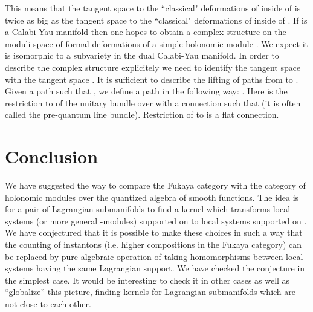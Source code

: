 \documentclass[a4paper,12pt]{article}
\begin{document}
This means that the tangent space to the ``classical" deformations
of \coordHE{} inside of \coordHE{} is twice as big as the tangent space to the
``classical" deformations of \coordHE{} inside of \coordHE{}.
If \coordHE{} is a Calabi-Yau manifold then one hopes to obtain a complex
structure on the moduli space of formal deformations of a simple
holonomic module \coordHE{}. We expect it is isomorphic to a subvariety in the dual 
Calabi-Yau manifold.
In order to describe the complex structure explicitely
we need to identify the tangent
space \coordHE{} with the tangent space \coordHE{}.
It is sufficient to describe the lifting of paths from \coordHE{} to
\coordHE{}. Given a path \coordHE{} such that \coordHE{},
we define a path \coordHE{} in the following way:
\coordHE{}. Here \coordHE{} is the restriction to \coordHE{}
of the  unitary bundle over \coordHE{}
with a connection \myHighlight{$\nabla$}\coordHE{} such that \coordHE{}
(it is often called the pre-quantum line bundle).
Restriction of \myHighlight{$\nabla$}\coordHE{} to \coordHE{} is a flat connection. 

\section{Conclusion}

We have suggested the way to compare the Fukaya category with the category
of holonomic modules over the quantized algebra of smooth functions.
The idea is for a pair of Lagrangian submanifolds \coordHE{} to find
a kernel \coordHE{} which transforms local systems (or more general
\coordHE{}-modules) supported on \coordHE{} to local systems supported on \coordHE{}.
We have conjectured that it is possible to make these choices in such a way that
the counting of instantons (i.e. higher compositions in the Fukaya category)
can be replaced by pure algebraic operation of taking homomorphisms
between local systems having the same Lagrangian support. We have checked
the conjecture in the simplest case.
It would be interesting to check it in other cases as well as  ``globalize'' this picture, finding kernels
\coordHE{} for Lagrangian submanifolds which are not close to each other.
\end{document}
